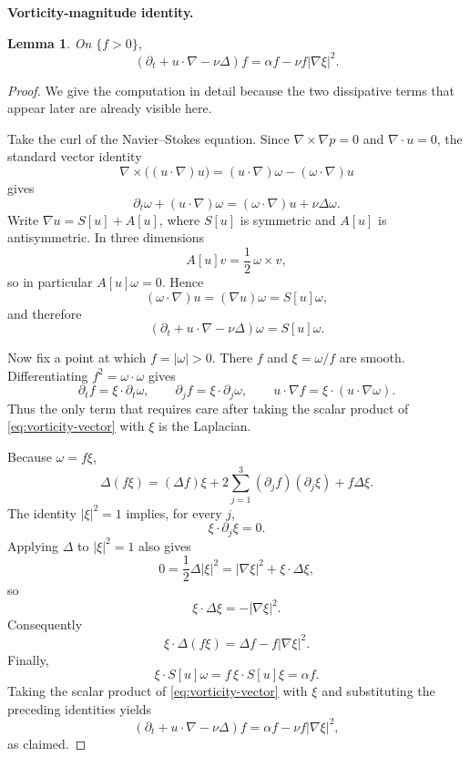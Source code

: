 \documentclass[11pt]{article}
\newtheorem{lemma}[theorem]{Lemma}
\theoremstyle{definition}\newtheorem{definition}[theorem]{Definition}
\theoremstyle{remark}\newtheorem{remark}[theorem]{Remark}
\begin{document}
\medskip
\noindent\textbf{Vorticity-magnitude identity.}
\begin{lemma}\label{lem:magnitude}
On $\{f>0\}$,
\[
(\partial_t+u\cdot\nabla-\nu\Delta)f
=\alpha f-\nu f|\nabla\xi|^2.
\]
\end{lemma}
\begin{proof}
We give the computation in detail because the two dissipative terms that appear
later are already visible here.

Take the curl of the Navier--Stokes equation.  Since
$\nabla\times\nabla p=0$ and $\nabla\cdot u=0$, the standard vector identity
\[
\nabla\times\bigl((u\cdot\nabla)u\bigr)
=(u\cdot\nabla)\omega-(\omega\cdot\nabla)u
\]
gives
\[
\partial_t\omega+(u\cdot\nabla)\omega
=(\omega\cdot\nabla)u+\nu\Delta\omega.
\]
Write $\nabla u=S[u]+A[u]$, where $S[u]$ is symmetric and $A[u]$ is
antisymmetric.  In three dimensions
\[
A[u]v=\frac12\,\omega\times v,
\]
so in particular $A[u]\omega=0$.  Hence
\[
(\omega\cdot\nabla)u=(\nabla u)\omega=S[u]\omega,
\]
and therefore
\begin{equation}\label{eq:vorticity-vector}
(\partial_t+u\cdot\nabla-\nu\Delta)\omega=S[u]\omega.
\end{equation}

Now fix a point at which $f=|\omega|>0$.  There $f$ and
$\xi=\omega/f$ are smooth.  Differentiating $f^2=\omega\cdot\omega$ gives
\[
\partial_t f=\xi\cdot\partial_t\omega,
\qquad
\partial_jf=\xi\cdot\partial_j\omega,
\qquad
u\cdot\nabla f=\xi\cdot (u\cdot\nabla\omega).
\]
Thus the only term that requires care after taking the scalar product of
\eqref{eq:vorticity-vector} with $\xi$ is the Laplacian.

Because $\omega=f\xi$,
\[
\Delta(f\xi)
=(\Delta f)\xi+2\sum_{j=1}^3(\partial_jf)(\partial_j\xi)
+f\Delta\xi.
\]
The identity $|\xi|^2=1$ implies, for every $j$,
\[
\xi\cdot\partial_j\xi=0.
\]
Applying $\Delta$ to $|\xi|^2=1$ also gives
\[
0=\frac12\Delta|\xi|^2
=|\nabla\xi|^2+\xi\cdot\Delta\xi,
\]
so
\[
\xi\cdot\Delta\xi=-|\nabla\xi|^2.
\]
Consequently
\[
\xi\cdot\Delta(f\xi)
=\Delta f-f|\nabla\xi|^2.
\]
Finally,
\[
\xi\cdot S[u]\omega
=f\,\xi\cdot S[u]\xi
=\alpha f.
\]
Taking the scalar product of \eqref{eq:vorticity-vector} with $\xi$ and
substituting the preceding identities yields
\[
(\partial_t+u\cdot\nabla-\nu\Delta)f
=\alpha f-\nu f|\nabla\xi|^2,
\]
as claimed.
\end{proof}
\end{document}
